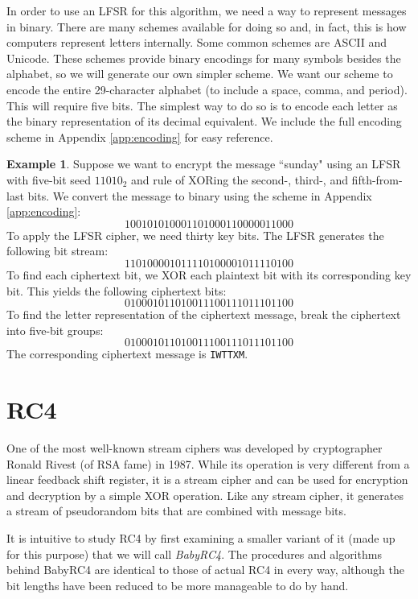 \documentclass{book}
\theoremstyle{plain}
\theoremstyle{definition}
\newtheorem{example}[theorem]{Example}
\newcommand{\ciphertext}[1]{\texttt{#1}} %
\begin{document}
In order to use an LFSR for this algorithm, we need a way to represent messages in binary. There are many schemes available for doing so and, in fact, this is how computers represent letters internally. Some common schemes are ASCII and Unicode. These schemes provide binary encodings for many symbols besides the alphabet, so we will generate our own simpler scheme. We want our scheme to encode the entire 29-character alphabet (to include a space, comma, and period). This will require five bits. The simplest way to do so is to encode each letter as the binary representation of its decimal equivalent. We include the full encoding scheme in Appendix \ref{app:encoding} for easy reference.

\begin{example}
Suppose we want to encrypt the message ``sunday" using an LFSR with five-bit seed $11010_2$ and rule of XORing the second-, third-, and fifth-from-last bits. We convert the message to binary using the scheme in Appendix \ref{app:encoding}:
$$100101010001101000110000011000$$
To apply the LFSR cipher, we need thirty key bits. The LFSR generates the following bit stream:
$$110100001011110100001011110100$$
To find each ciphertext bit, we XOR each plaintext bit with its corresponding key bit. This yields the following ciphertext bits:
$$010001011010011100111011101100$$
To find the letter representation of the ciphertext message, break the ciphertext into five-bit groups:
$$01000 10110 10011 10011 10111 01100$$
The corresponding ciphertext message is \ciphertext{IWTTXM}.
\end{example}

\section{RC4}
One of the most well-known stream ciphers was developed by cryptographer Ronald Rivest (of RSA fame) in 1987. While its operation is very different from a linear feedback shift register, it is a stream cipher and can be used for encryption and decryption by a simple XOR operation. Like any stream cipher, it generates a stream of pseudorandom bits that are combined with message bits.

It is intuitive to study RC4 by first examining a smaller variant of it (made up for this purpose) that we will call \textit{BabyRC4}. The procedures and algorithms behind BabyRC4 are identical to those of actual RC4 in every way, although the bit lengths have been reduced to be more manageable to do by hand.
\end{document}
